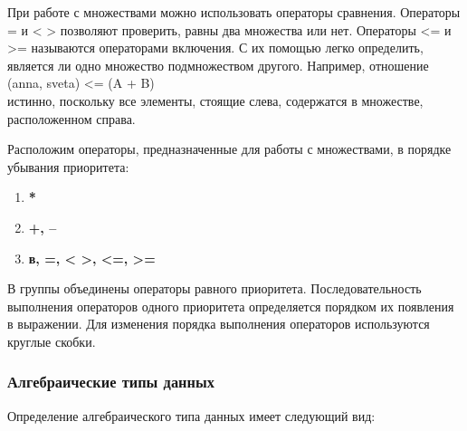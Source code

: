 \documentclass[10pt]{report}
\begin{document}
При работе с множествами можно использовать операторы сравнения. Операторы = и < > позволяют проверить, равны два множества или нет. Операторы <= и >= называются операторами включения. С их помощью легко определить, является ли одно множество подмножеством другого. 
Например, отношение \\
\hspace*{5mm} (anna, sveta) <= (A + B) \\
истинно, поскольку все элементы, стоящие слева, содержатся в множестве, расположенном справа.

Расположим операторы, предназначенные для работы с множествами, в порядке убывания приоритета:

\begin{enumerate}
\item
\textbf{*}\\
\item
\textbf{+, --}\\
\item
\textbf{в, =, < >, <=, >=}\\
\end{enumerate}
В группы объединены операторы равного приоритета. Последовательность выполнения операторов одного приоритета определяется порядком их появления в выражении. Для изменения порядка выполнения операторов используются круглые скобки.

        \subsubsection{Алгебраические типы данных}
Определение алгебраического типа данных имеет следующий вид:

\textcolor{Green}{}
\end{document}
